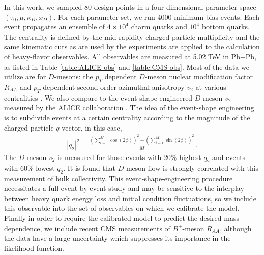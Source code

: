 \documentclass[aps, prc, reprint, amsmath, groupedaddress, nofootinbib]{revtex4-1}
\begin{document}
In this work, we sampled 80 design points in a four dimensional parameter space $(\tau_0, \mu, \kappa_D, x_D)$.
For each parameter set, we run 4000 minimum bias events.
Each event propagates an ensemble of $4\times 10^4$ charm quarks and $10^4$ bottom quarks.
The centrality is defined by the mid-rapidity charged particle multiplicity and the same kinematic cuts as are used by the experiments are applied to the calculation of heavy-flavor observables.
All observables are measured at 5.02 TeV in Pb+Pb, as listed in Table \ref{table:ALICE-obs} and \ref{table:CMS-obs}. Most of the data we utilize are for $D$-mesons: the
 $p_T$ dependent $D$-meson nuclear modification factor $R_{AA}$ and $p_T$ dependent second-order azimuthal anisotropy $v_2$ at various centralities \cite{Sirunyan:2017plt, Sirunyan:2017xss, Acharya:2017qps,Grosa:2017zcz}.
We also compare to the event-shape-engineered $D$-meson $v_2$ measured by the  ALICE collaboration \cite{Grosa:2017zcz}.
The idea of the event-shape engineering is to subdivide events at a certain centrality according to the magnitude of the charged particle $q$-vector, in this case,
\begin{eqnarray}
|q_2|^2 = \frac{\left(\sum_{i=1}^{M} \cos(2\phi) \right)^2+ \left(\sum_{i=1}^{M} \sin(2\phi) \right)^2}{M} \, .
\end{eqnarray}
The $D$-meson $v_2$ is measured for those events with $20\%$ highest $q_2$ and events with $60\%$ lowest $q_2$.
It is found that $D$-meson flow is strongly correlated with this measurement of bulk collectivity.
This event-shape-engineering procedure necessitates a full event-by-event study and may be sensitive to the interplay between heavy quark energy loss and initial condition fluctuations, so we include this observable into the set of observables on which we calibrate the model.
Finally in order to require the calibrated model to predict the desired mass-dependence, we include recent CMS measurements of $B^{\pm}$-meson $R_{AA}$, although the data have a large uncertainty which suppresses its importance in the likelihood function.
\end{document}
